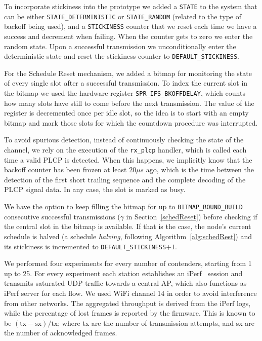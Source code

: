 To incorporate stickiness into the prototype we added a {\tt STATE} to the system that can be either {\tt STATE\_DETERMINISTIC} or {\tt STATE\_RANDOM} (related to the type of backoff being used), and a {\tt STICKINESS} counter that we reset each time we have a success and decrement when failing. When the counter gets to zero we enter the random state. Upon a successful transmission we unconditionally enter the deterministic state and reset the stickiness counter to {\tt DEFAULT\_STICKINESS}.

For the Schedule Reset mechanism, we added a bitmap for monitoring the state of every single slot after a successful transmission. To index the current slot in the bitmap we used the hardware register {\tt SPR\_IFS\_BKOFFDELAY}, which counts how many slots have still to come before the next transmission. The value of the register is decremented once per idle slot, so the idea is to start with an empty bitmap and mark those slots for which the countdown procedure was interrupted. 

To avoid spurious detection, instead of continuously checking the state of the channel, we rely on the execution of the {\tt rx\_plcp} handler, which is called each time a valid PLCP is detected. When this happens, we implicitly know that the backoff counter has been frozen at least $20\mu s$ ago, which is the time between the detection of the first short trailing sequence and the complete decoding of the PLCP signal data. In any case, the slot is marked as busy.

We have the option to keep filling the bitmap for up to {\tt BITMAP\_ROUND\_BUILD} consecutive successful transmissions ($\gamma$ in Section~\ref{schedReset}) before checking if the central slot in the bitmap is available. If that is the case, the node's current schedule is halved (a schedule \emph{halving}, following Algorithm~\ref{alg:schedRest}) and its stickiness is incremented to {\tt DEFAULT\_STICKINESS}$+1$.

We performed four experiments for every number of contenders, starting from 1 up to 25. For every experiment each station establishes an iPerf~\cite{tirumala2005iperf} session and transmits saturated UDP traffic towards a central AP, which also functions as iPerf server for each flow. We used WiFi channel 14  in order to avoid interference from other networks. The aggregated throughput is derived from the iPerf logs, while the percentage of lost frames is reported by the firmware. This is known to be $(\text{tx}-\text{sx})/\text{tx}$; where tx are the number of transmission attempts, and sx are the number of acknowledged frames.

